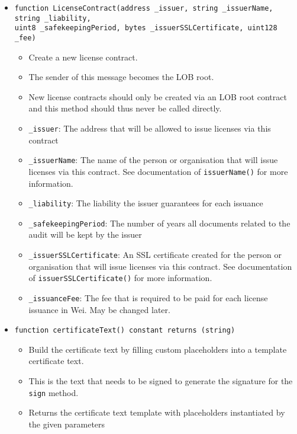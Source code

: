 \documentclass[a4paper]{article}
\begin{document}
\begin{itemize}
  \item \texttt{function LicenseContract(address \_issuer, string \_issuerName, string \_liability, \\uint8 \_safekeepingPeriod, bytes \_issuerSSLCertificate, uint128 \_fee)}
  \begin{itemize}
    \item Create a new license contract.
    \item The sender of this message becomes the LOB root.
    \item New license contracts should only be created via an LOB root contract and this method should thus never be called directly.
    \item \texttt{\_issuer}: The address that will be allowed to issue licenses via this contract
    \item \texttt{\_issuerName}: The name of the person or organisation that will issue licenses via this contract. See documentation of \texttt{issuerName()} for more information.
    \item \texttt{\_liability}:  The liability the issuer guarantees for each issuance
    \item \texttt{\_safekeepingPeriod}: The number of years all documents related to the audit will be kept by the issuer
    \item \texttt{\_issuerSSLCertificate}: An SSL certificate created for the person or organisation that will issue licenses via this contract. See documentation of \texttt{issuerSSLCertificate()} for more information.
    \item \texttt{\_issuanceFee}: The fee that is required to be paid for each license issuance in Wei. May be changed later.

  \end{itemize}
  
  \item \texttt{function certificateText() constant returns (string)}
  \begin{itemize}
    \item Build the certificate text by filling custom placeholders into a template certificate text.
    \item This is the text that needs to be signed to generate the signature for the \texttt{sign} method.
    \item Returns the certificate text template with placeholders instantiated by the given parameters
  \end{itemize}
  

\end{itemize}
\end{document}

